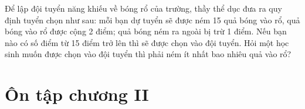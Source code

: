 \begin{exercises}
\begin{questions}[resume=SGK]
        \answerline
        \answerline
        \answerline

        \item Để lập đội tuyển năng khiếu về bóng rổ của trường, thầy thể dục đưa ra quy định tuyển chọn như sau: mỗi bạn dự tuyển sẽ được ném 15 quả bóng vào rổ, quả bóng vào rổ được cộng 2 điểm; quả bóng ném ra ngoài bị trừ 1 điểm. Nếu bạn nào có số điểm từ 15 điểm trở lên thì sẽ được chọn vào đội tuyển. Hỏi một học sinh muốn được chọn vào đội tuyển thì phải ném ít nhất bao nhiêu quả vào rổ?

        \answerline
        \answerline
        \answerline
    \end{questions}
\end{exercises}

\section*{Ôn tập chương II}

